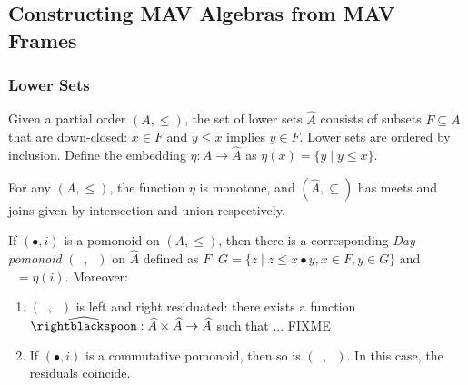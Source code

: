 \subsection{Constructing MAV Algebras from MAV Frames}

\newcommand{\LowerSet}[1]{\widehat{#1}}


\subsubsection{Lower Sets}

\begin{definition}
  Given a partial order $(A, \leq)$, the set of lower sets
  $\LowerSet{A}$ consists of subsets $F \subseteq A$ that are
  down-closed: $x \in F$ and $y \leq x$ implies $y \in F$. Lower sets
  are ordered by inclusion. Define the embedding
  $\eta : A \to \LowerSet{A}$ as $\eta(x) = \{ y \mid y \leq x \}$.
\end{definition}

\begin{proposition}
  For any $(A, \leq)$, the function $\eta$ is monotone, and
  $(\LowerSet{A}, \subseteq)$ has meets and joins given by
  intersection and union respectively.

\end{proposition}

\newcommand{\Day}[1]{\mathop{\widehat{#1}}}

\begin{proposition}\label{prop:day-construction}
  If $(\bullet, i)$ is a pomonoid on $(A, \leq)$, then there is a
  corresponding \emph{Day pomonoid} $(\Day{\bullet}, \Day{i})$ on
  $\LowerSet{A}$ defined as
  $F \Day\bullet G = \{ z \mid z \leq x \bullet y, x \in F, y \in G
  \}$ and $\Day{i} = \eta(i)$. Moreover:
  \begin{enumerate}
  \item $(\Day{\bullet}, \Day{i})$ is left and right residuated: there
    exists a function
    $\Day{\rightblackspoon} : \LowerSet{A} \times \LowerSet{A} \to
    \LowerSet{A}$ such that ... FIXME
  \item If $(\bullet, i)$ is a commutative pomonoid, then so is
    $(\Day{\bullet}, \Day{i})$. In this case, the residuals coincide.
  \end{enumerate}
\end{proposition}

